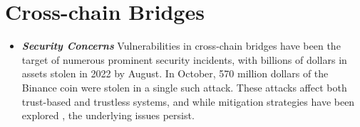 \section{Cross-chain Bridges} %

\begin{itemize}
\item {\bf \em Security Concerns}
Vulnerabilities in cross-chain bridges have been the target of numerous prominent security incidents, with billions of dollars in assets stolen in 2022 by August. \cite{2billion} 
In October, 570 million dollars of the Binance coin were stolen in a single such attack.\cite{binance}
These attacks affect both trust-based and trustless systems, and while mitigation strategies have been explored \cite{xscope}, the underlying issues persist.

\end{itemize}
